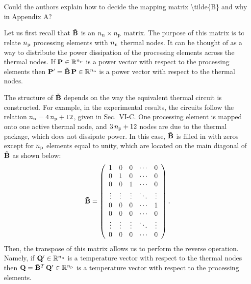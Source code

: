 \begin{reviewer}
Could the authors explain how to decide the mapping matrix \textbackslash{}tilde\{B\} and why in Appendix A?
\end{reviewer}
\begin{authors}
Let us first recall that $\mM$ is an ${n_\text{n}} \times {n_\text{p}}$ matrix.
The purpose of this matrix is to relate ${n_\text{p}}$ processing elements with ${n_\text{n}}$ thermal nodes.
It can be thought of as a way to distribute the power dissipation of the processing elements across the thermal nodes.
If $\mathbf{P} \in \mathbb{R}^{n_\text{p}}$ is a power vector with respect to the processing elements then $\v{P}' = \mM \, \v{P} \in \real^\nnodes$ is a power vector with respect to the thermal nodes.

The structure of $\mM$ depends on the way the equivalent thermal circuit is constructed.
For example, in the experimental results, the circuits follow the relation ${n_\text{n}} = 4 \, {n_\text{p}} + 12$, given in Sec.~VI-C.
One processing element is mapped onto one active thermal node, and $3 \, {n_\text{p}} + 12$ nodes are due to the thermal package, which does not dissipate power.
In this case, $\mM$ is filled in with zeros except for ${n_\text{p}}$ elements equal to unity, which are located on the main diagonal of $\mM$ as shown below:
\[
  \mM = \left(
    \begin{array}{ccccc}
      1 & 0 & 0 & \cdots & 0 \\
      0 & 1 & 0 & \cdots & 0 \\
      0 & 0 & 1 & \cdots & 0 \\
      \vdots & \vdots & \vdots & \ddots & \vdots \\
      0 & 0 & 0 & \cdots & 1 \\
      0 & 0 & 0 & \cdots & 0 \\
      \vdots & \vdots & \vdots & \ddots & \vdots \\
      0 & 0 & 0 & \cdots & 0
    \end{array}
  \right).
\]
Then, the transpose of this matrix allows us to perform the reverse operation.
Namely, if $\mathbf{Q}' \in \mathbb{R}^{n_\text{n}}$ is a temperature vector with respect to the thermal nodes then $\v{Q} = \mM^T \, \v{Q}' \in \real^\nprocs$ is a temperature vector with respect to the processing elements.

\begin{actions}
\end{actions}
\end{authors}

